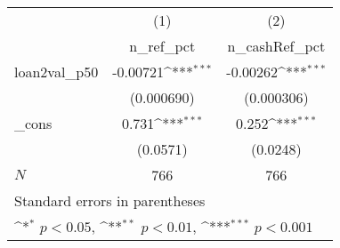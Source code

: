 {
\def\sym#1{\ifmmode^{#1}\else\(^{#1}\)\fi}
\begin{tabular}{l*{2}{c}}
\hline\hline
            &\multicolumn{1}{c}{(1)}&\multicolumn{1}{c}{(2)}\\
            &\multicolumn{1}{c}{n\_ref\_pct}&\multicolumn{1}{c}{n\_cashRef\_pct}\\
\hline
loan2val\_p50&    -0.00721\sym{***}&    -0.00262\sym{***}\\
            &  (0.000690)         &  (0.000306)         \\
[1em]
\_cons      &       0.731\sym{***}&       0.252\sym{***}\\
            &    (0.0571)         &    (0.0248)         \\
\hline
\(N\)       &         766         &         766         \\
\hline\hline
\multicolumn{3}{l}{\footnotesize Standard errors in parentheses}\\
\multicolumn{3}{l}{\footnotesize \sym{*} \(p<0.05\), \sym{**} \(p<0.01\), \sym{***} \(p<0.001\)}\\
\end{tabular}
}
